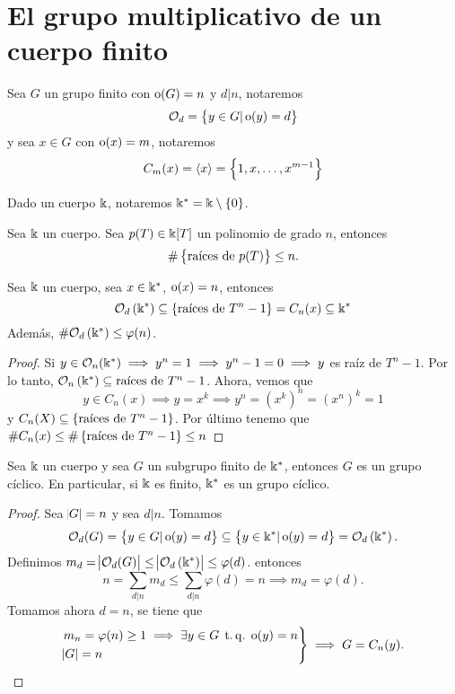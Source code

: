 \section{El grupo multiplicativo de un cuerpo finito}

\begin{obs}[Notación]
    Sea $G$ un grupo finito con $\operatorname{o}(G) = n$ y $d \vert n$, notaremos
    \[
        \mathcal{O}_d = \left\{y \in G \vert \operatorname{o}(y) = d\right\}
    \]
    y sea $x \in G$ con $\operatorname{o}(x) = m$, notaremos
    \[
        C_m(x) = \langle x \rangle = \left\{1, x, \dots, x^{m-1}\right\}
    \]
\end{obs}

\begin{obs}[Notación]
    Dado un cuerpo $\Bbbk$, notaremos $\Bbbk^\ast = \Bbbk \setminus \left\{0\right\}$.
\end{obs}

\begin{lema}
    Sea $\Bbbk$ un cuerpo. Sea $p(T) \in \Bbbk[T]$ un polinomio de grado $n$, entonces
    \[
        \# \left\{\text{raíces de } p(T)\right\} \leq n.
    \]
\end{lema}

\begin{lema}
    Sea $\Bbbk$ un cuerpo, sea $x \in \Bbbk^\ast$, $\operatorname{o}(x) = n$, entonces
    \[
        \mathcal{O}_d\left( \Bbbk^\ast \right) \subseteq \left\{ \text{raíces de } T^n -1\right\}
        = C_n(x) \subseteq \Bbbk^\ast
    \]
    Además, $\#\mathcal{O}_d\left( \Bbbk^\ast \right) \leq \varphi(n)$.
\end{lema}

\begin{proof}
    Si $y \in \mathcal{O}_n(\Bbbk^\ast) \implies y^n = 1 \implies y^n -1 = 0 \implies y$ es raíz de $T^n -1$.
    Por lo tanto, $\mathcal{O}_n\left( \Bbbk^\ast \right) \subseteq{\text{raíces de } T^n -1}$. Ahora, vemos que
    \[
        y \in C_n(x) \implies y = x^k \implies y^n = \left( x^k \right)^n = \left( x^n \right)^k = 1
    \]
    y $C_n(X) \subseteq \left\{\text{raíces de } T^n -1\right\}$. Por último tenemo que 
    $\# C_n(x) \leq \# \left\{\text{raíces de } T^n -1\right\} \leq n$
\end{proof}

\begin{teo*}
    Sea $\Bbbk$ un cuerpo y sea $G$ un subgrupo finito de $\Bbbk^\ast$, entonces $G$ es un grupo
    cíclico. En particular, si $\Bbbk$ es finito, $\Bbbk^\ast$ es un grupo cíclico.
\end{teo*}

\begin{proof}
    Sea $\abs{G} = n$ y sea $d \vert n$. Tomamos
    \[
        \mathcal{O}_d(G) = \left\{y \in G \vert \operatorname{o}(y) = d\right\} \subseteq
        \left\{y \in \Bbbk^\ast \vert \operatorname{o}(y) = d\right\} = \mathcal{O}_d\left( \Bbbk^\ast \right).
    \]
    Definimos $m_d = \abs{\mathcal{O}_d(G)} \leq \abs{\mathcal{O}_d\left( \Bbbk^\ast \right)} \leq \varphi(d)$.
    entonces
    \[
        n = \sum_{d \vert n} m_d \leq \sum_{d \vert n} \varphi(d) = n \implies m_d = \varphi(d).
    \]
    Tomamos ahora $d = n$, se tiene que
    \[
        \begin{rcases}
            m_n = \varphi(n) \geq 1 \implies \exists y \in G \operatorname{\;t.q.\;} \operatorname{o}(y) = n \\
            \abs{G} = n
        \end{rcases}
        \implies G = C_n(y).
    \]
\end{proof}
